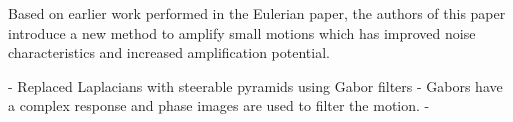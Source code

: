 \documentclass{article}
\begin{document}
Based on earlier work performed in the Eulerian paper, the authors of this paper introduce a new method to amplify small motions which has improved noise characteristics and increased amplification potential.

- Replaced Laplacians with steerable pyramids using Gabor filters
- Gabors have a complex response and phase images are used to filter the motion.
-
\end{document}
